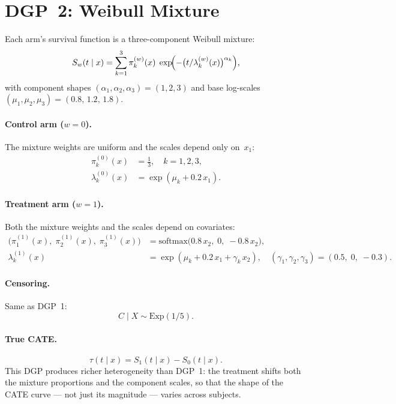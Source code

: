\documentclass{article}
\begin{document}
\section*{DGP~2: Weibull Mixture}

Each arm's survival function is a three-component Weibull mixture:
\[
  S_w(t \mid x)
  = \sum_{k=1}^{3} \pi_k^{(w)}(x)\;
    \exp\!\Bigl(-\bigl(t / \lambda_k^{(w)}(x)\bigr)^{\alpha_k}\Bigr),
\]
with component shapes $(\alpha_1, \alpha_2, \alpha_3) = (1, 2, 3)$ and base log-scales $(\mu_1, \mu_2, \mu_3) = (0.8,\, 1.2,\, 1.8)$.

\paragraph{Control arm ($w=0$).}
The mixture weights are uniform and the scales depend only on~$x_1$:
\begin{align}
  \pi_k^{(0)}(x) &= \tfrac{1}{3}, \quad k=1,2,3, \\
  \lambda_k^{(0)}(x) &= \exp(\mu_k + 0.2\, x_1).
\end{align}

\paragraph{Treatment arm ($w=1$).}
Both the mixture weights and the scales depend on covariates:
\begin{align}
  \bigl(\pi_1^{(1)}(x),\; \pi_2^{(1)}(x),\; \pi_3^{(1)}(x)\bigr)
    &= \mathrm{softmax}\!\bigl(0.8\, x_2,\; 0,\; -0.8\, x_2\bigr), \\
  \lambda_k^{(1)}(x)
    &= \exp(\mu_k + 0.2\, x_1 + \gamma_k\, x_2),
    \quad (\gamma_1, \gamma_2, \gamma_3) = (0.5,\; 0,\; -0.3).
\end{align}

\paragraph{Censoring.}  Same as DGP~1:
\[
  C \mid X \sim \mathrm{Exp}(1/5).
\]

\paragraph{True CATE.}
\[
  \tau(t \mid x) = S_1(t \mid x) - S_0(t \mid x).
\]
This DGP produces richer heterogeneity than DGP~1: the treatment shifts both the mixture proportions and the component scales, so that the shape of the CATE curve --- not just its magnitude --- varies across subjects.
\end{document}
